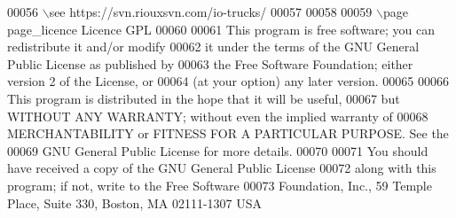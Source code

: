 \begin{DoxyCode}
00056 \(\backslash\)see https://svn.riouxsvn.com/io-trucks/
00057 
00058 
00059 \(\backslash\)page page\_licence Licence GPL
00060 
00061 This program is free software; you can redistribute it and/or modify
00062 it under the terms of the GNU General Public License as published by
00063 the Free Software Foundation; either version 2 of the License, or
00064 (at your option) any later version.
00065 
00066 This program is distributed in the hope that it will be useful,
00067 but WITHOUT ANY WARRANTY; without even the implied warranty of
00068 MERCHANTABILITY or FITNESS FOR A PARTICULAR PURPOSE. See the
00069 GNU General Public License for more details.
00070 
00071 You should have received a copy of the GNU General Public License
00072 along with this program; if not, write to the Free Software
00073 Foundation, Inc., 59 Temple Place, Suite 330, Boston, MA 02111-1307 USA
\end{DoxyCode}
